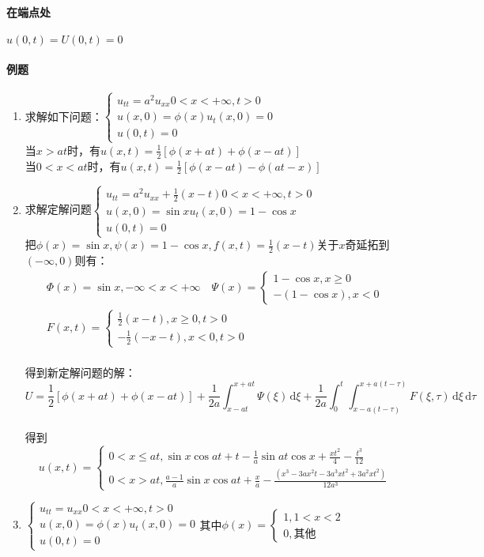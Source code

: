 \paragraph{在端点处}\(u(0,t)=U(0,t)=0\)

\paragraph{例题}
\begin{enumerate}
    \item 求解如下问题：\(\begin{cases}u_{tt}=a^2u_{xx}0<x<+\infty,t>0\\u(x,0)=\phi(x)u_t(x,0)=0\\u(0,t)=0\end{cases}\)\\
    当\(x>at\)时，有\(u(x,t)=\frac{1}{2}[\phi(x+at)+\phi(x-at)]\)\\
    当\(0<x<at\)时，有\(u(x,t)=\frac{1}{2}[\phi(x-at)-\phi(at-x)]\)
    \item 求解定解问题\(\begin{cases}u_{tt}=a^2u_{xx}+\frac{1}{2}(x-t)0<x<+\infty,t>0\\u(x,0)=\sin{x}u_t(x,0)=1-\cos{x}\\u(0,t)=0\end{cases}\)\\
    把\(\phi(x)=\sin{x},\psi(x)=1-\cos{x},f(x,t)=\frac{1}{2}(x-t)\)关于\(x\)奇延拓到\((-\infty,0)\)则有：\begin{gather*}\Phi(x)=\sin{x},-\infty<x<+\infty\quad\Psi(x)=\begin{cases}1-\cos{x},x\geq0\\-(1-\cos{x}),x<0\end{cases}\\F(x,t)=\begin{cases}\frac{1}{2}\left(x-t\right),x\geq0,t>0\\-\frac{1}{2}\left(-x-t\right),x<0,t>0\end{cases}\end{gather*}\\
	得到新定解问题的解：\[U=\frac{1}{2}[\phi(x+at)+\phi(x-at)]+\frac{1}{2a}\int_{x-at}^{x+at}{\Psi(\xi)\,\mathrm{d}\xi}+\frac{1}{2a}\int_{0}^{t}{\int_{x-a(t-\tau)}^{x+a(t-\tau)}F\left(\xi,\tau\right)\,\mathrm{d}\xi \,\mathrm{d}\tau}\]\\
	得到\[u(x,t)=\begin{cases}0<x\leq at,\sin{x}\cos{at}+t-\frac{1}{a}\sin{at}\cos{x}+\frac{xt^2}{4}-\frac{t^3}{12}\\0<x>at,\frac{a-1}{a}\sin{x}\cos{at}+\frac{x}{a}-\frac{(x^3-3ax^2t-3a^3xt^2+3a^2xt^2)}{12a^3}\end{cases}\]
    \item \(\begin{cases}u_{tt}=u_{xx}0<x<+\infty,t>0\\u(x,0)=\phi(x)u_t(x,0)=0\\u(0,t)=0\end{cases}\)其中\(\phi(x)=\begin{cases}1,1<x<2\\0,\text{其他}\end{cases}\)
\end{enumerate}

